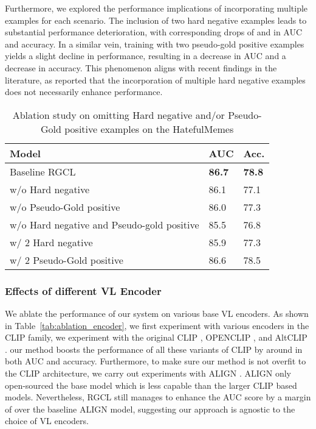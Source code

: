 \documentclass[11pt]{article}
\begin{document}
Furthermore, we explored the performance implications of incorporating multiple examples for each scenario. The inclusion of two hard negative examples leads to substantial performance deterioration, with corresponding drops of  and  in AUC and accuracy. In a similar vein, training with two pseudo-gold positive examples yields a slight decline in performance, resulting in a  decrease in AUC and a  decrease in accuracy. This phenomenon aligns with recent findings in the literature, as \citet{dpr2020} reported that the incorporation of multiple hard negative examples does not necessarily enhance performance.
\begin{table}[htb]
\small
\caption{Ablation study on omitting Hard negative and/or Pseudo-Gold positive examples on the HatefulMemes}
\label{tab:ablation_examples}
\centering
\begin{tabularx}{0.48\textwidth}{Xll}
\toprule
 Model                     & \textbf{AUC} & \textbf{Acc}.  \\ 
\midrule
Baseline RGCL & \textbf{86.7} & \textbf{78.8}\\ \midrule
w/o Hard negative & 86.1 & 77.1 \\
w/o Pseudo-Gold positive & 86.0 & 77.3 \\
w/o Hard negative and Pseudo-gold positive & 85.5 &  76.8\\
\midrule
w/ 2 Hard negative & 85.9 & 77.3 \\
w/ 2 Pseudo-Gold positive & 86.6 & 78.5 \\
\bottomrule
\end{tabularx}
\end{table}
\subsubsection{Effects of different VL Encoder}
\label{sec:abl_encoder}
We ablate the performance of our system on various base VL encoders. As shown in Table~\ref{tab:ablation_encoder}, we first experiment with various encoders in the CLIP family, we experiment with the original CLIP \cite{clip2021}, OPENCLIP \cite{ilharco_gabriel_OPENCLIP2021,schuhmann2022laionbopenclip,cherti2023reproducibleopenclip}, and AltCLIP \cite{chen2022altclip}. 
our method boosts the performance of all these variants of CLIP by around  in both AUC and accuracy. Furthermore, to make sure our method is not overfit to the CLIP architecture, we carry out experiments with ALIGN \cite{Jia2021ALIGN}. ALIGN only open-sourced the base model which is less capable than the larger CLIP based models. Nevertheless, RGCL still manages to enhance the AUC score by a margin of  over the baseline ALIGN model, suggesting our approach is agnostic to the choice of VL encoders. 
\end{document}
